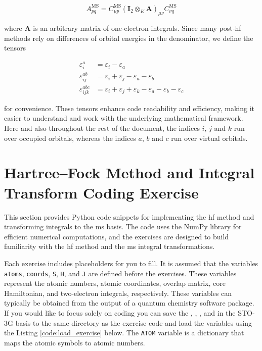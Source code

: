 \begin{equation}
A_{pq}^{\mathrm{MS}}=C_{\mu p}^{\mathrm{MS}}(\mathbf{I}_{2}\otimes_K\mathbf{A})_{\mu\nu}C_{\nu q}^{\mathrm{MS}}
\end{equation}

where \(\mathbf{A}\) is an arbitrary matrix of one-electron integrals. Since many \acrshort{post-hf} methods rely on differences of orbital energies in the denominator, we define the tensors

\begin{align}
\varepsilon^{a}_{i}&=\varepsilon_i-\varepsilon_a \\
\varepsilon^{ab}_{ij}&=\varepsilon_i+\varepsilon_j-\varepsilon_a-\varepsilon_b \\
\varepsilon^{abc}_{ijk}&=\varepsilon_i+\varepsilon_j+\varepsilon_k-\varepsilon_a-\varepsilon_b-\varepsilon_c
\end{align}

for convenience. These tensors enhance code readability and efficiency, making it easier to understand and work with the underlying mathematical framework. Here and also throughout the rest of the document, the indices \(i\), \(j\) and \(k\) run over occupied orbitals, whereas the indices \(a\), \(b\) and \(c\) run over virtual orbitals.

\section{\texorpdfstring{Hartree--Fock Method and Integral Transform Coding Exercise\label{sec:hf_int_code_exercise}}{Hartree--Fock Method and Integral Transform Coding Exercise}}

This section provides Python code snippets for implementing the \acrshort{hf} method and transforming integrals to the \acrshort{ms} basis. The code uses the NumPy library for efficient numerical computations, and the exercises are designed to build familiarity with the \acrshort{hf} method and the \acrshort{ms} integral transformations.

Each exercise includes placeholders for you to fill. It is assumed that the variables \texttt{\lstinline!atoms!}, \texttt{\lstinline!coords!}, \texttt{\lstinline!S!}, \texttt{\lstinline!H!}, and \texttt{\lstinline!J!} are defined before the exercises. These variables represent the atomic numbers, atomic coordinates, overlap matrix, core Hamiltonian, and two-electron integrals, respectively. These variables can typically be obtained from the output of a quantum chemistry software package. If you would like to focus solely on coding you can save the , , , and  in the STO-3G basis to the same directory as the exercise code and load the variables using the Listing \ref{code:load_exercise} below. The \texttt{\lstinline!ATOM!} variable is a dictionary that maps the atomic symbols to atomic numbers.

